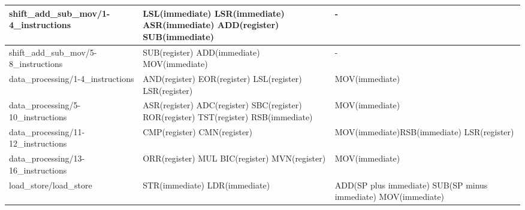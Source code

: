 \documentclass{article}
\begin{document}
\begin{tabularx}{\textwidth}{|l|X|X|}
        shift{\_}add{\_}sub{\_}mov/1-4{\_}instructions & LSL(immediate) \newline LSR(immediate) \newline ASR(immediate) \newline ADD(register) \newline SUB(immediate) & -\\
        \hline
        shift{\_}add{\_}sub{\_}mov/5-8{\_}instructions & SUB(register) \newline ADD(immediate) \newline MOV(immediate) & -\\
        \hline
        data{\_}processing/1-4{\_}instructions         & AND(register) \newline EOR(register) \newline LSL(register) \newline LSR(register) & MOV(immediate)\\
        \hline
        data{\_}processing/5-10{\_}instructions        & ASR(register) \newline ADC(register) \newline SBC(register) \newline ROR(register) \newline TST(register) \newline RSB(immediate) & MOV(immediate)\\
        \hline
        data{\_}processing/11-12{\_}instructions       & CMP(register) \newline CMN(register)                                                                                              & MOV(immediate)\newline RSB(immediate) \newline LSR(register)                         \\
        \hline
        data{\_}processing/13-16{\_}instructions       & ORR(register) \newline MUL \newline BIC(register) \newline MVN(register) & MOV(immediate)\\
        \hline
        load{\_}store/load{\_}store                    & STR(immediate) \newline LDR(immediate)                                                                                            & ADD(SP plus immediate) \newline SUB(SP minus immediate) \newline MOV(immediate)      \\

\end{tabularx}
\end{document}
